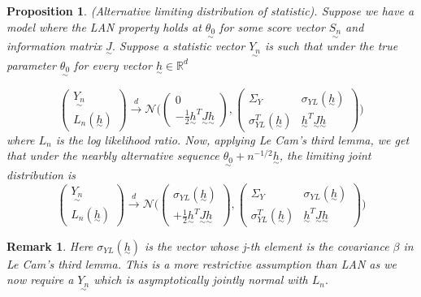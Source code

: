 \documentclass[twoside]{article}
\newtheorem{proposition}[theorem]{Proposition}
\newtheorem{remark}[theorem]{Remark}
\newcommand{\utilde}{\underset{\sim}}
\begin{document}
\begin{proposition}(Alternative limiting distribution of statistic). 
Suppose we have a model where the LAN property holds at $\utilde{\theta_0}$ for some score vector $\utilde{S_n}$ and information matrix $\utilde{J}.$ Suppose a statistic vector $\utilde{Y_n}$ is such that under the true parameter $\utilde{\theta_0}$ for every vector $\utilde{h} \in \mathbb{R}^d$

\begin{equation}
\begin{pmatrix}
\utilde{Y_n}\\
L_n(\utilde{h})
\end{pmatrix}
 \xrightarrow{d} \mathcal{N}
\bigg( 
\begin{pmatrix}
0 \\
-\frac{1}{2}\utilde{h}^T\utilde{J}\utilde{h}
\end{pmatrix}
,
\begin{pmatrix}
\Sigma_Y & \sigma_{YL}(\utilde{h}) \\
\sigma_{YL}^T(\utilde{h}) & \utilde{h}^T\utilde{J}\utilde{h}
\end{pmatrix}
\bigg) \tag{*}
\end{equation}
where $L_n$ is the log likelihood ratio. Now, applying Le Cam's third lemma, we get that under the nearbly alternative sequence $\utilde{\theta_0} + n^{-1/2}\utilde{h}$, the limiting joint distribution is
$$
\begin{pmatrix}
\utilde{Y_n}\\
L_n(\utilde{h})
\end{pmatrix}
 \xrightarrow{d} \mathcal{N}
\bigg( 
\begin{pmatrix}
\sigma_{YL}(\utilde{h}) \\
+\frac{1}{2}\utilde{h}^T\utilde{J}\utilde{h}
\end{pmatrix}
,
\begin{pmatrix}
\Sigma_Y & \sigma_{YL}(\utilde{h}) \\
\sigma_{YL}^T(\utilde{h}) & \utilde{h}^T\utilde{J}\utilde{h}
\end{pmatrix}
\bigg)
$$
\end{proposition}
\begin{remark} Here $\sigma_{YL}(\utilde{h})$ is the vector whose j-th element is the covariance $\beta$ in Le Cam's third lemma. This is a more restrictive assumption than LAN as we now require a $\utilde{Y_n}$ which is asymptotically jointly normal with $L_n.$
\end{remark}
\end{document}
